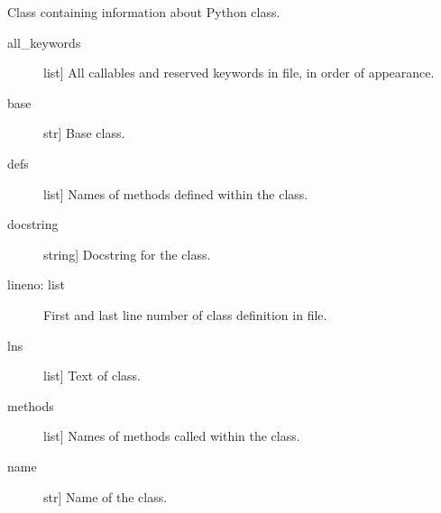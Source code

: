 \documentclass[letterpaper,10pt,english]{sphinxmanual}
\begin{document}
\begin{fulllineitems}
\label{\detokenize{index:unicity.ClassInfo}}
Class containing information about Python class.
\begin{description}
\item[{all\_keywords}] \leavevmode{[}list{]}
All callables and reserved keywords in file, in order of appearance.

\item[{base}] \leavevmode{[}str{]}
Base class.

\item[{defs}] \leavevmode{[}list{]}
Names of methods defined within the class.

\item[{docstring}] \leavevmode{[}string{]}
Docstring for the class.

\item[{lineno: list}] \leavevmode
First and last line number of class definition in file.

\item[{lns}] \leavevmode{[}list{]}
Text of class.

\item[{methods}] \leavevmode{[}list{]}
Names of methods called within the class.

\item[{name}] \leavevmode{[}str{]}
Name of the class.

\end{description}

\end{fulllineitems}




\renewcommand{\indexname}{Index}
\printindex
\end{document}
